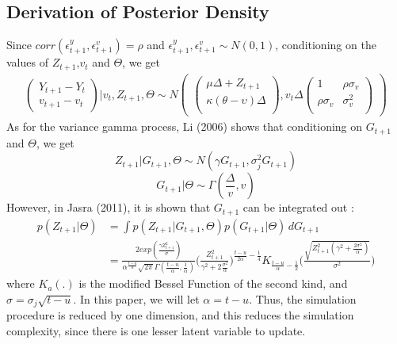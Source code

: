\documentclass[12pt]{article}
\theoremstyle{definition}
\begin{document}
\subsection{Derivation of Posterior Density}
Since $corr(\epsilon_{t+1}^{y},\epsilon_{t+1}^{v})=\rho$ and $\epsilon_{t+1}^{y},\epsilon_{t+1}^{v} \sim N(0,1)$, conditioning on the values of $Z_{t+1}$,$v_{t}$ and $\Theta$, we get
\begin{equation}
	\begin{aligned}
\begin{pmatrix}
Y_{t+1} - Y_{t}\\
v_{t+1} - v_{t}
\end{pmatrix} | v_{t},Z_{t+1},\Theta
\sim
N
\begin{pmatrix}
\begin{pmatrix}
\mu \Delta + Z_{t+1} \\
\kappa (\theta - \upsilon) \Delta \\
\end{pmatrix}
,
v_{t} \Delta
\begin{pmatrix}
1 & \rho \sigma_{v} \\
\rho \sigma_{v} & \sigma_{v}^2 \\
\end{pmatrix}
\end{pmatrix}
	\end{aligned}
\end{equation}
As for the variance gamma process, Li (2006) shows that conditioning on $G_{t+1}$ and $\Theta$, we get
$$Z_{t+1} | G_{t+1},\Theta \sim N(\gamma G_{t+1},\sigma_{j}^{2}G_{t+1})$$ 
$$G_{t+1} | \Theta \sim \Gamma(\frac{\Delta}{v},v)$$
However, in Jasra (2011), it is shown that $G_{t+1}$ can be integrated out \citep{madan1998variance}:
\begin{equation}
	\begin{aligned}
		p(Z_{t+1}|\Theta) &= \int p(Z_{t+1}|G_{t+1},\Theta)p(G_{t+1}|\Theta) \,dG_{t+1}\\
		&= \frac{2exp(\frac{\gamma Z_{t+1}^{2}}{\sigma})}{\alpha^{\frac{t-u}{\alpha}}\sqrt{2\pi} \Gamma(\frac{t-u}{\alpha},\frac{1}{\alpha})}\Bigg(\frac{Z_{t+1}^{2}}{\gamma^{2}+2\frac{\sigma^{2}}{\alpha}}\Bigg)^{\frac{t-u}{2\alpha}-\frac{1}{4}}K_{\frac{t-u}{\alpha}-\frac{1}{2}}\Bigg(\frac{\sqrt{Z_{t+1}^{2}(\gamma^{2}+\frac{2\sigma^{2}}{\alpha})}}{\sigma^{2}}\Bigg)
	\end{aligned}
\end{equation}
where $K_{a}(.)$ is the modified Bessel Function of the second kind, and $\sigma = \sigma_{j}\sqrt{t-u}$. In this paper, we will let $\alpha = t-u$. Thus, the simulation procedure is reduced by one dimension, and this reduces the simulation complexity, since there is one lesser latent variable to update. \\
\end{document}

